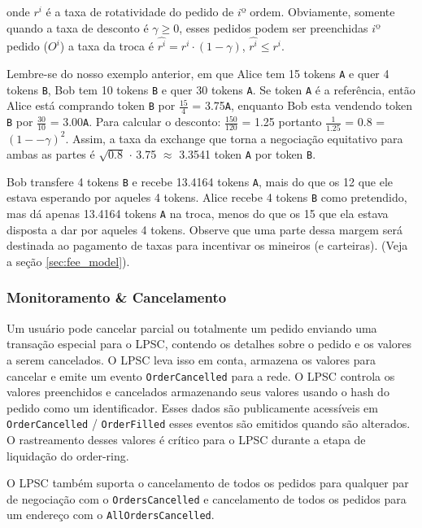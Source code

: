 \documentclass[UTF8,nofonts]{article}
\begin{document}
\begin{multicols}{2}
onde $r^i$ é a taxa de rotatividade do pedido de $i$º ordem. Obviamente, somente quando a taxa de desconto é $\gamma \ge 0$, esses pedidos podem ser preenchidas $i$º pedido ($O^i$) a taxa da troca é $\hat{r^i} = r^i \cdot (1-\gamma)$, $\hat{r^i}\le r^i$.

Lembre-se do nosso exemplo anterior, em que Alice tem 15 tokens \verb|A| e quer 4 tokens \verb|B|, Bob tem 10 tokens \verb|B| e quer 30 tokens \verb|A|. Se token \verb|A| é a referência, então Alice está comprando token \verb|B| por $\frac{15}{4}$ = 3.75\verb|A|, enquanto Bob esta vendendo token \verb|B| por $\frac{30}{10}$ = 3.00\verb|A|. Para calcular o desconto: $\frac{150}{120}$ = 1.25 portanto $\frac{1}{1.25}$ = 0.8 = $(1 −- \gamma)^2$. Assim, a taxa da exchange que torna a negociação equitativo para ambas as partes é $\sqrt{0.8}$ $\cdot$ 3.75 $\approx$ 3.3541 token \verb|A| por token \verb|B|.

Bob transfere 4 tokens \verb|B| e recebe 13.4164 tokens \verb|A|, mais do que os 12 que ele estava esperando por aqueles 4 tokens. Alice recebe 4 tokens \verb|B| como pretendido, mas dá apenas 13.4164 tokens \verb|A| na troca, menos do que os 15 que ela estava disposta a dar por aqueles 4 tokens.
Observe que uma parte dessa margem será destinada ao pagamento de taxas para incentivar os mineiros (e carteiras). (Veja a seção \ref{sec:fee_model}).


\subsubsection{Monitoramento \& Cancelamento}

Um usuário pode cancelar parcial ou totalmente um pedido enviando uma transação especial para o LPSC, contendo os detalhes sobre o pedido e os valores a serem cancelados. O LPSC leva isso em conta, armazena os valores para cancelar e emite um evento \verb|OrderCancelled| para a rede. O LPSC controla os valores preenchidos e cancelados armazenando seus valores usando o hash do pedido como um identificador. Esses dados são publicamente acessíveis em \verb|OrderCancelled| / \verb|OrderFilled| esses eventos são emitidos quando são alterados. O rastreamento desses valores é crítico para o LPSC durante a etapa de liquidação do order-ring.

O LPSC também suporta o cancelamento de todos os pedidos para qualquer par de negociação com o \verb|OrdersCancelled| e cancelamento de todos os pedidos para um endereço com o \verb|AllOrdersCancelled|.



\end{multicols}
\end{document}
